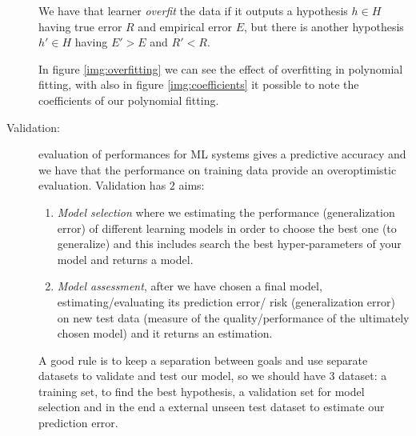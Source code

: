 \begin{description}
                            \begin{defi}[overfitting]
                            We have that learner \emph{overfit} the data if it outputs a hypothesis $h \in H$
                            having true error $R$ and empirical error $E$, but there is another hypothesis $h' \in H$
                            having $E' > E$ and $R' < R$.
                            \end{defi}
                            In figure \ref{img:overfitting} we can see the effect of overfitting in polynomial
                            fitting, with also in figure \ref{img:coefficients} it possible to note the 
                            coefficients of our polynomial fitting.
    \item [Validation: ] evaluation of performances for ML systems gives a predictive accuracy and we have
                         that the performance on training data provide an overoptimistic evaluation.\newline
                         Validation has $2$ aims:
                         \begin{enumerate}
                            \item \emph{Model selection} where we estimating the performance (generalization error)
                                  of different learning models in order to choose the best one (to generalize) and 
                                  this includes search the best hyper-parameters of your model and returns a model.
                            \item \emph{Model assessment}, after we have chosen a final model,
                                  estimating/evaluating its prediction error/ risk (generalization error)
                                  on new test data (measure of the quality/performance of the ultimately chosen model)
                                  and it returns an estimation.
                         \end{enumerate}
                         A good rule is to keep a separation between goals and use separate datasets to validate
                         and test our model, so we should have $3$ dataset: a training set, to find the best 
                         hypothesis, a validation set for model selection and in the end a external unseen 
                         test dataset to estimate our prediction error.
                            

\end{description}
